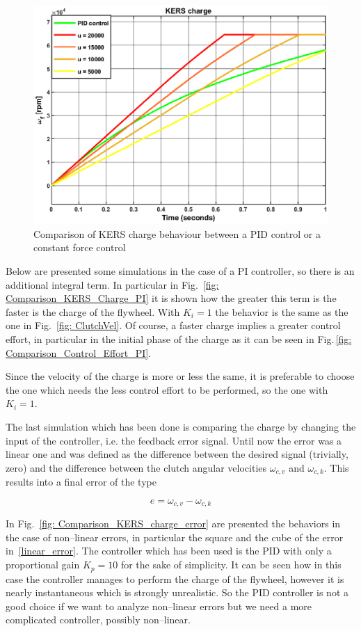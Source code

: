 \documentclass[11pt]{article}
\begin{document}
\begin{figure}[H]
\centering
\includegraphics[width=.6\textwidth]{Images/Results_Dynamics/Charge_comparison/kers_charge_constantforce.eps}
\caption{Comparison of KERS charge behaviour between a PID control or a constant force control }
\label{fig: Comparison_KERS_Charge_Control}
\end{figure}

Below are presented some simulations in the case of a PI controller, so there is an additional integral term. In particular in Fig.~\ref{fig: Comparison_KERS_Charge_PI} it is shown how the greater this term is the faster is the charge of the flywheel. With $K_i = 1$ the behavior is the same as the one in Fig.~\ref{fig: ClutchVel}. Of course, a faster charge implies a greater control effort, in particular in the initial phase of the charge as it can be seen in Fig.\,\ref{fig: Comparison_Control_Effort_PI}. 

Since the velocity of the charge is more or less the same, it is preferable to choose the one which needs the less control effort to be performed, so the one with $K_i = 1$.

The last simulation which has been done is comparing the charge by changing the input of the controller, i.e. the feedback error signal. Until now the error was a linear one and was defined as the difference between the desired signal (trivially, zero) and the difference between the clutch angular velocities $\omega_{c,v}$ and $\omega_{c,k}$. This results into a final error of the type

\begin{equation}
e = \omega_{c,v} - \omega_{c,k}
\label{linear_error}
\end{equation}

In Fig.~\ref{fig: Comparison_KERS_charge_error} are presented the behaviors in the case of non--linear errors, in particular the square and the cube of the error in~\eqref{linear_error}. The controller which has been used is the PID with only a proportional gain $K_p = 10$ for the sake of simplicity. It can be seen how in this case the controller manages to perform the charge of the flywheel, however it is nearly instantaneous which is strongly unrealistic. So the PID controller is not a good choice if we want to analyze non--linear errors but we need a more complicated controller, possibly non--linear.
\end{document}
